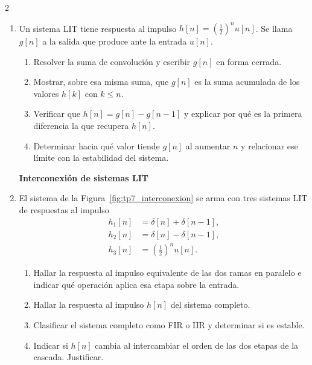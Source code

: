 \documentclass[10pt,a4paper]{article}
\begin{document}
\begin{multicols}{2}
\begin{enumerate}
		\item Un sistema LIT tiene respuesta al impulso
		$h[n]=\left(\tfrac{1}{2}\right)^{n} u[n]$. Se llama $g[n]$ a la salida
		que produce ante la entrada $u[n]$.
		\begin{enumerate}
			\item Resolver la suma de convolución y escribir $g[n]$ en forma
			cerrada.
			\item Mostrar, sobre esa misma suma, que $g[n]$ es la suma
			acumulada de los valores $h[k]$ con $k \le n$.
			\item Verificar que $h[n]=g[n]-g[n-1]$ y explicar por qué es la
			primera diferencia la que recupera $h[n]$.
			\item Determinar hacia qué valor tiende $g[n]$ al aumentar $n$ y
			relacionar ese límite con la estabilidad del sistema.
		\end{enumerate}

		\textbf{Interconexión de sistemas LIT}

		\item El sistema de la Figura~\ref{fig:tp7_interconexion} se arma con
		tres sistemas LIT de respuestas al impulso
		\begin{align*}
			h_1[n] &= \delta[n]+\delta[n-1], \\
			h_2[n] &= \delta[n]-\delta[n-1], \\
			h_3[n] &= \left(\tfrac{1}{2}\right)^{\!n} u[n].
		\end{align*}

		\begin{center}
			
			\label{fig:tp7_interconexion}
		\end{center}

		\begin{enumerate}
			\item Hallar la respuesta al impulso equivalente de las dos ramas
			en paralelo e indicar qué operación aplica esa etapa sobre la
			entrada.
			\item Hallar la respuesta al impulso $h[n]$ del sistema completo.
			\item Clasificar el sistema completo como FIR o IIR y determinar
			si es estable.
			\item Indicar si $h[n]$ cambia al intercambiar el orden de las dos
			etapas de la cascada. Justificar.
		\end{enumerate}


\end{enumerate}
\end{multicols}
\end{document}
